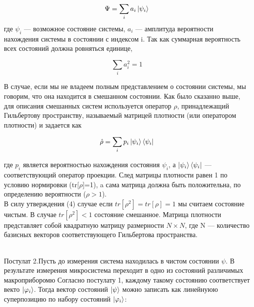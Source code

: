 \documentclass[a4paper, 10pt]{article}
\begin{document}
        \begin{equation}\label{link name}
            \Psi = \sum_i a_i \ket{\psi_i}
        \end{equation}
        где $\psi_i$ --- возможное состояние системы, $a_i$ --- амплитуда вероятности нахождения системы в состоянии с индексом i. Так как суммарная 
        вероятность всех состояний должна ровняться единице,
        
        \begin{equation}\label{link name}
            \sum_{i} a_i^2 = 1
        \end{equation}

        В случае, если мы не владеем полным представлением о состоянии системы, мы говорим, что она находится в смешанном состоянии. Как было сказанно выше,
        для описания смешанных систем используется оператор $\rho$, принадлежащий Гильбертову пространству, называемый матрицей плотности (или оператором 
        плотности) и задается как

        \begin{equation}\label{link name}
            \hat{\rho} = \sum_i p_i \ket{\psi_i} \bra{\psi_i}
        \end{equation}

        где $p_i$ является вероятностью нахождения состояния $\psi_i$, а $\ket{\psi_i}\bra{\psi_i}$ --- соответствующий оператор проекции.
        След матрицы плотности равен 1 по условию нормировки (tr[$\rho$]=1), a сама матрица должна быть положительна, 
        по определению вероятности ($\rho > 1$). \\
        В силу утверждения (4) случае если $tr[\rho^2] = tr[\rho] = 1$ мы считаем состояние чистым. В случае $tr[\rho^2] < 1$ состояние смешанное.
        Матрица плотности представляет собой квадратную матрицу размерности $N \times N$, где N --- количество базисных векторов соответствующего 
        Гильбертова пространства.
        \\ \\
        \begin{itshape}
            Постулат 2.Пусть до измерения система находилась в чистом состоянии $\psi$. В результате измерения микросистема 
            переходит в одно из состояний различимых макроприборомю Согласно постулату 1, каждому такому состоянию соответствует векто $\ket{\varphi_i}$. 
            Тогда вектор состояний $\ket{\psi}$ можно записать как линейнуюю суперпозицию по набору состояний $\ket{\varphi_i}$:
        \end{itshape}
        \\
\end{document}
